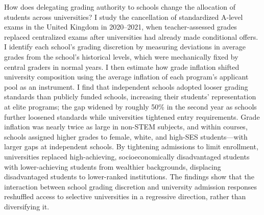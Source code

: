 

How does delegating grading authority to schools change the allocation of students across universities? I study the cancellation of standardized A-level exams in the United Kingdom in 2020--2021, when teacher-assessed grades replaced centralized exams after universities had already made conditional offers. I identify each school's grading discretion by measuring deviations in average grades from the school's historical levels, which were mechanically fixed by central graders in normal years. I then estimate how grade inflation shifted university composition using the average inflation of each program's applicant pool as an instrument. I find that independent schools adopted looser grading standards than publicly funded schools, increasing their students' representation at elite programs; the gap widened by roughly 50\% in the second year as schools further loosened standards while universities tightened entry requirements. Grade inflation was nearly twice as large in non-STEM subjects, and within courses, schools assigned higher grades to female, white, and high-SES students---with larger gaps at independent schools. By tightening admissions to limit enrollment, universities replaced high-achieving, socioeconomically disadvantaged students with lower-achieving students from wealthier backgrounds, displacing disadvantaged students to lower-ranked institutions. The findings show that the interaction between school grading discretion and university admission responses reshuffled access to selective universities in a regressive direction, rather than diversifying it.